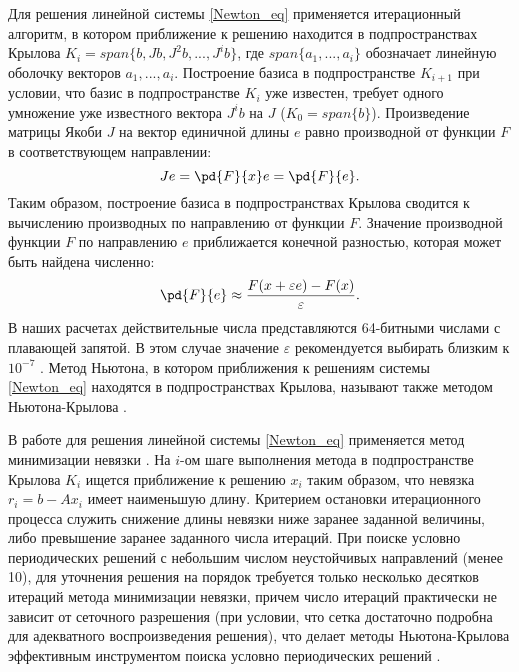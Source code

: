 Для решения линейной системы \eqref{Newton_eq} применяется итерационный алгоритм, в котором приближение к решению находится в подпространствах Крылова $K_i = span\{b, Jb, J^2b, ... , J^ib\}$, где $span\{a_1, ..., a_i\}$ обозначает линейную оболочку векторов $a_1, ..., a_i$. Построение базиса в подпространстве $K_{i+1}$ при условии, что базис в подпространстве $K_i$ уже известен, требует одного умножение уже известного вектора $J^ib$ на $J$ ($K_0 = span\{b\}$). Произведение матрицы Якоби $J$ на вектор единичной длины $e$ равно производной от функции $F$ в соответствующем направлении:
\begin{equation} \label{Je_eq}
Je = \pd{F}{x} e = \pd{F}{e}. 
\end{equation}
Таким образом, построение базиса в подпространствах Крылова сводится к вычислению производных по направлению от функции $F$. Значение производной функции $F$ по направлению $e$ приближается конечной разностью, которая может быть найдена численно:
\begin{equation}\label{fd_eq}
\pd{F}{e} \approx \frac{F(x + \varepsilon e) - F(x)}{\varepsilon}.
\end{equation}
В наших расчетах действительные числа представляются 64-битными числами с плавающей запятой. В этом случае значение $\varepsilon$ рекомендуется выбирать близким к $10^{-7}$ \cite{Viswanath2007}. Метод Ньютона, в котором приближения к решениям системы \eqref{Newton_eq} находятся в подпространствах Крылова, называют также методом Ньютона-Крылова \cite{Sanchez2004}. 

В работе для решения линейной системы \eqref{Newton_eq} применяется метод минимизации невязки \cite{EEbook}. На $i$-ом шаге выполнения метода в подпространстве Крылова $K_i$ ищется приближение к решению $x_i$ таким образом, что невязка $r_i = b - Ax_i$ имеет наименьшую длину. Критерием остановки итерационного процесса служить снижение длины невязки ниже заранее заданной величины, либо превышение заранее заданного числа итераций. При поиске условно периодических решений с небольшим числом неустойчивых направлений (менее 10), для уточнения решения на порядок требуется только несколько десятков итераций метода минимизации невязки, причем число итераций практически не зависит от сеточного разрешения (при условии, что сетка достаточно подробна для адекватного воспроизведения решения), что делает методы Ньютона-Крылова эффективным инструментом поиска условно периодических решений \cite{Dijkstra2014}. 


